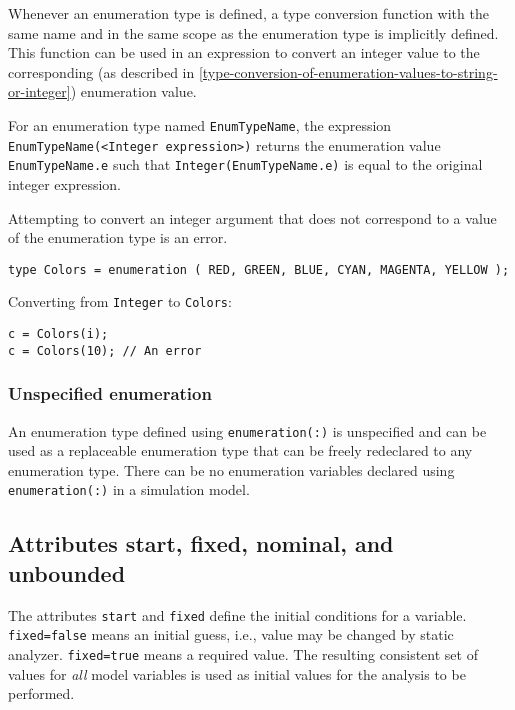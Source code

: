Whenever an enumeration type is defined, a type conversion function with
the same name and in the same scope as the enumeration type is
implicitly defined. This function can be used in an expression to
convert an integer value to the corresponding (as described in \cref{type-conversion-of-enumeration-values-to-string-or-integer}) enumeration value.

For an enumeration type named \lstinline!EnumTypeName!, the expression
\lstinline!EnumTypeName(<Integer expression>)! returns the
enumeration value \lstinline!EnumTypeName.e! such that \lstinline!Integer(EnumTypeName.e)! is
equal to the original integer expression.

Attempting to convert an integer argument that does not correspond to a
value of the enumeration type is an error.

\begin{example}
\begin{lstlisting}[language=modelica]
type Colors = enumeration ( RED, GREEN, BLUE, CYAN, MAGENTA, YELLOW );
\end{lstlisting}

Converting from \lstinline!Integer! to \lstinline!Colors!:
\begin{lstlisting}[language=modelica]
c = Colors(i);
c = Colors(10); // An error
\end{lstlisting}
\end{example}

\subsubsection{Unspecified enumeration}\label{unspecified-enumeration}

An enumeration type defined using \lstinline!enumeration(:)! is unspecified and can
be used as a replaceable enumeration type that can be freely redeclared
to any enumeration type. There can be no enumeration variables declared
using \lstinline!enumeration(:)! in a simulation model.



\subsection{Attributes start, fixed, nominal, and unbounded}\label{attributes-start-fixed-nominal-and-unbounded}

The attributes \lstinline!start! and \lstinline!fixed! define the initial conditions for a
variable. \lstinline!fixed=false! means an initial guess, i.e., value may be
changed by static analyzer. \lstinline!fixed=true! means a required value. The
resulting consistent set of values for \emph{all} model variables is used as
initial values for the analysis to be performed.

